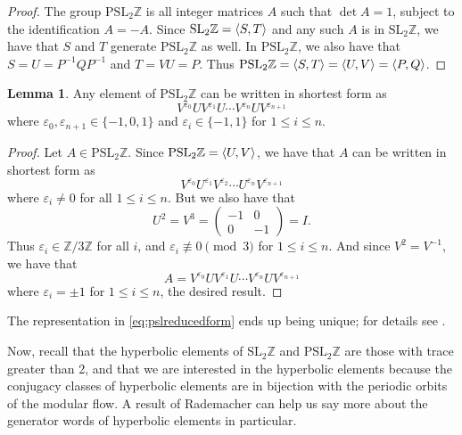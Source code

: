 \documentclass[12pt,twoside]{reedthesis}
\theoremstyle{definition}
\newtheorem{lemma}[thm]{Lemma}
\newcommand{\Z}{\mathbb{Z}}
\newcommand{\SLZ}{\mathrm{SL}_2{\Z}}
\newcommand{\PSLZ}{\mathrm{PSL}_2{\Z}}
\DeclarePairedDelimiter\ang{\langle}{\rangle}
\begin{document}
\begin{proof}
  The group $\PSLZ$ is all integer matrices $A$ such that $\det A = 1$, subject to the identification $A = -A$.
  Since $\SLZ = \ang{S,T}$ and any such $A$ is in $\SLZ$, we have that $S$ and $T$ generate $\PSLZ$ as well.
  In $\PSLZ$, we also have that $S = U = P^{-1}QP^{-1}$ and $T = VU = P$.
  Thus $\PSLZ = \ang{S,T} = \ang{U,V} = \ang{P,Q}$.
\end{proof}

\begin{lemma}
  Any element of $\PSLZ$ can be written in shortest form as
  \begin{equation}\label{eq:pslreducedform}
    V^{\varepsilon_0} U V^{\varepsilon_1} U \cdots V^{\varepsilon_{n}} U V^{\varepsilon_{n+1}}
  \end{equation}
  where $\varepsilon_0, \varepsilon_{n+1} \in \{-1,0,1\}$ and $\varepsilon_i \in \{-1,1\}$ for $1 \leq i \leq n$.
\end{lemma}

\begin{proof}
  Let $A \in \PSLZ$.
  Since $\PSLZ = \ang{U,V}$, we have that $A$ can be written in shortest form as
  \begin{equation*}
    V^{\varepsilon_0} U^{\varepsilon_1} V^{\varepsilon_2} \cdots U^{\varepsilon_{n}} V^{\varepsilon_{n+1}}
  \end{equation*}
  where $\varepsilon_i \neq 0$ for all $ 1 \leq i \leq n$.
  But we also have that
  \begin{equation*}
    U^2 = V^3 = \begin{pmatrix}
      -1 & 0 \\
      0 & -1
    \end{pmatrix}
    = I.
  \end{equation*}
  Thus $\varepsilon_i \in \Z / 3 \Z$ for all $i$, and $\varepsilon_i \not\equiv 0 \pmod 3$ for $1 \leq i \leq n$.
  And since $V^2 = V^{-1}$, we have that
  \begin{equation*}
    A = V^{\varepsilon_0} U V^{\varepsilon_1} U \cdots V^{\varepsilon_n} U V^{\varepsilon_{n+1}}
  \end{equation*}
  where $\varepsilon_i = \pm 1$ for $1 \leq i \leq n$, the desired result.
\end{proof}

The representation in \eqref{eq:pslreducedform} ends up being unique; for details see \cite[12]{rankin1977modular}.

Now, recall that the hyperbolic elements of $\SLZ$ and $\PSLZ$ are those with trace greater than 2, and that we are interested in the hyperbolic elements because the conjugacy classes of hyperbolic elements are in bijection with the periodic orbits of the modular flow.
A result of Rademacher can help us say more about the generator words of hyperbolic elements in particular.
\end{document}
